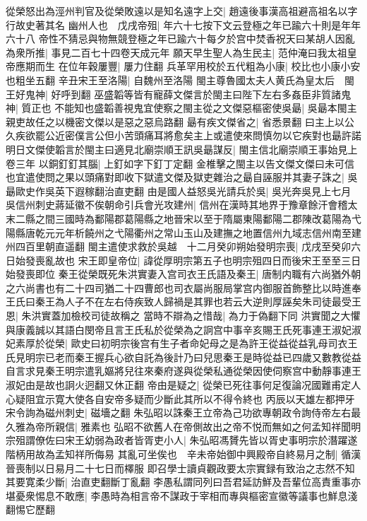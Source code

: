 從榮怒出為涇州判官及從榮敗遠以是知名遠字上交|{
	趙遠後事漢高祖避高祖名以字行故史著其名}
幽州人也　戊戌帝殂|{
	年六十七按下文云登極之年已踰六十則是年年六十八}
帝性不猜忌與物無競登極之年已踰六十每夕於宫中焚香祝天曰某胡人因亂為衆所推|{
	事見二百七十四卷天成元年}
願天早生聖人為生民主|{
	范仲淹曰我太祖皇帝應期而生}
在位年穀屢豐|{
	屢力住翻}
兵革罕用校於五代粗為小康|{
	校比也小康小安也粗坐五翻}
辛丑宋王至洛陽|{
	自魏州至洛陽}
閩主尊魯國太夫人黄氏為皇太后　閩王好鬼神|{
	好呼到翻}
巫盛韜等皆有寵薛文傑言於閩主曰陛下左右多姦臣非質諸鬼神|{
	質正也}
不能知也盛韜善視鬼宜使察之閩主從之文傑惡樞密使吳朂|{
	吳朂本閩主親吏故任之以機密文傑以是惡之惡烏路翻}
朂有疾文傑省之|{
	省悉景翻}
曰主上以公久疾欲罷公近密僕言公但小苦頭痛耳將愈矣主上或遣使來問慎勿以它疾對也朂許諾明日文傑使韜言於閩主曰適見北廟崇順王訊吳朂謀反|{
	閩主信北廟崇順王事始見上卷三年}
以銅釘釘其腦|{
	上釘如字下釘丁定翻}
金椎擊之閩主以告文傑文傑曰未可信也宜遣使問之果以頭痛對即收下獄遣文傑及獄吏雜治之朂自誣服并其妻子誅之|{
	吳朂歐史作吳英下遐稼翻治直吏翻}
由是國人益怒吳光請兵於吳|{
	吳光奔吳見上七月}
吳信州刺史蔣延徽不俟朝命引兵會光攻建州|{
	信州在漢時其地界于豫章餘汗會稽太末二縣之間三國時為鄱陽郡葛陽縣之地晉宋以至于隋屬東陽鄱陽二郡陳改葛陽為弋陽縣唐乾元元年析饒州之弋陽衢州之常山玉山及建撫之地置信州九域志信州南至建州四百里朝直遥翻}
閩主遣使求救於吳越　十二月癸卯朔始發明宗喪|{
	戊戌至癸卯六日始發喪亂故也}
宋王即皇帝位|{
	諱從厚明宗第五子也明宗殂四日而後宋王至至三日始發喪即位}
秦王從榮既死朱洪實妻入宫司衣王氏語及秦王|{
	唐制内職有六尚猶外朝之六尚書也有二十四司猶二十四曹郎也司衣屬尚服局掌宫内御服首飾整比以時進奉}
王氏曰秦王為人子不在左右侍疾致人歸禍是其罪也若云大逆則厚誣矣朱司徒最受王恩|{
	朱洪實蓋加檢校司徒故稱之}
當時不辯為之惜哉|{
	為力于偽翻下同}
洪實聞之大懼與康義誠以其語白閔帝且言王氏私於從榮為之詗宫中事辛亥賜王氏死事連王淑妃淑妃素厚於從榮|{
	歐史曰初明宗後宫有生子者命妃母之是為許王從益從益乳母司衣王氏見明宗已老而秦王握兵心欲自託為後計乃曰兒思秦王是時從益已四歲又數教從益自言求見秦王明宗遣乳嫗將兒往來秦府遂與從榮私通從榮因使伺察宫中動靜事連王淑妃由是故也詗火迥翻又休正翻}
帝由是疑之|{
	從榮已死往事何足復論况國難甫定人心疑阻宜示寛大使各自安帝多疑而少斷此其所以不得令終也}
丙辰以天雄左都押牙宋令詢為磁州刺史|{
	磁墻之翻}
朱弘昭以誅秦王立帝為己功欲專朝政令詢侍帝左右最久雅為帝所親信|{
	雅素也}
弘昭不欲舊人在帝側故出之帝不悦而無如之何孟知祥聞明宗殂謂僚佐曰宋王幼弱為政者皆胥吏小人|{
	朱弘昭馮贇先皆以胥史事明宗於潛躍遂階柄用故為孟知祥所侮易}
其亂可坐俟也　辛未帝始御中興殿帝自終易月之制|{
	循漢晉喪制以日易月二十七日而檡服}
即召學士讀貞觀政要太宗實録有致治之志然不知其要寛柔少斷|{
	治直吏翻斷丁亂翻}
李愚私謂同列曰吾君延訪鮮及吾輩位高責重事亦堪憂衆惕息不敢應|{
	李愚時為相言帝不謀政于宰相而專與樞密宣徽等議事也鮮息淺翻惕它歷翻}

